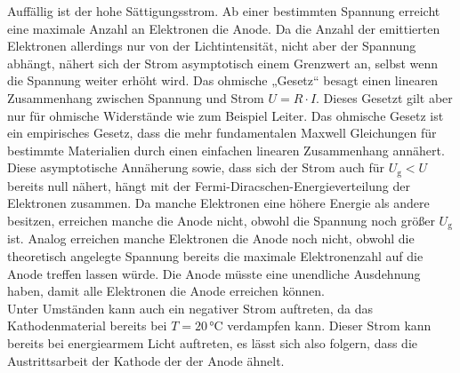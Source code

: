 Auffällig ist der hohe Sättigungsstrom.
Ab einer bestimmten Spannung erreicht eine maximale Anzahl an Elektronen die Anode.
Da die Anzahl der emittierten Elektronen allerdings nur von der Lichtintensität, nicht aber der Spannung abhängt, nähert sich der Strom asymptotisch einem Grenzwert an, selbst wenn die Spannung weiter erhöht wird.
Das ohmische „Gesetz“ besagt einen linearen Zusammenhang zwischen Spannung und Strom $ U = R \cdot I $. Dieses Gesetzt gilt aber nur für ohmische Widerstände wie zum Beispiel Leiter. Das ohmische Gesetz ist ein empirisches Gesetz, dass die mehr fundamentalen Maxwell Gleichungen für bestimmte Materialien durch einen einfachen linearen Zusammenhang annähert. \\

Diese asymptotische Annäherung sowie, dass sich der Strom auch für $U_\text{g} < U$ bereits null nähert, hängt mit der Fermi-Diracschen-Energieverteilung der Elektronen zusammen.
Da manche Elektronen eine höhere Energie als andere besitzen, erreichen manche die Anode nicht, obwohl die Spannung noch größer $U_\text{g}$ ist.
Analog erreichen manche Elektronen die Anode noch nicht, obwohl die theoretisch angelegte Spannung bereits die maximale Elektronenzahl auf die Anode treffen lassen würde. Die Anode müsste eine unendliche Ausdehnung haben, damit alle Elektronen die Anode erreichen können. \\

Unter Umständen kann auch ein negativer Strom auftreten, da das Kathodenmaterial bereits bei $T = 20 \,\si{\celsius}$ verdampfen kann.
Dieser Strom kann bereits bei energiearmem Licht auftreten, es lässt sich also folgern, dass die Austrittsarbeit der Kathode der der Anode ähnelt.



